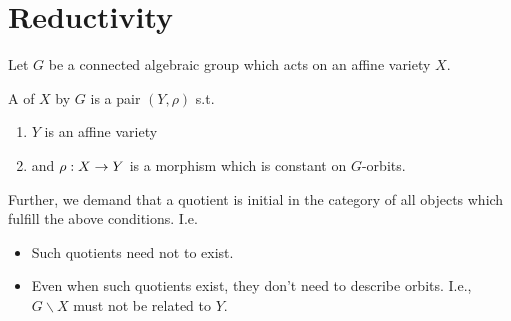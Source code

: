 \section{Reductivity}
Let $G$ be a connected algebraic group which acts on an affine variety $X$.
\begin{definition}
	A  of $X$ by $G$ is a pair $(Y, \rho)$ s.t.
	\begin{enumerate}
		\item $Y$ is an affine variety
		\item and $\rho : X \overset{}{\rightarrow} Y$ is a morphism which is constant on $G$-orbits.
	\end{enumerate}
Further, we demand that a quotient is initial in the category of all objects which fulfill the above conditions. I.e.
\begin{center}
\end{center}
\end{definition}

\begin{remark}
	\begin{itemize}
		\item Such quotients need not to exist.
		\item Even when such quotients exist, they don't need to describe orbits. I.e., $G\backslash X$ must not be related to $Y$.
	\end{itemize}
\end{remark}

